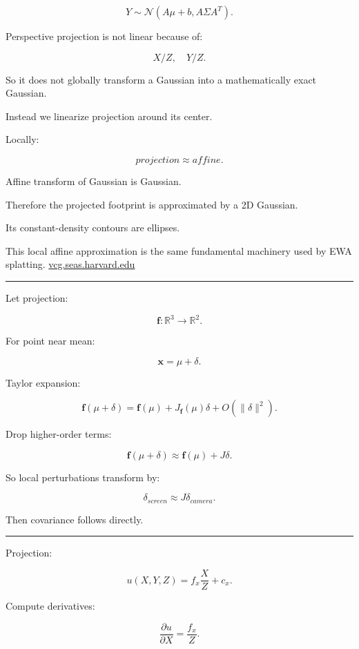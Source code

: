 \[
Y
\sim
\mathcal N(
A\mu+b,
A\Sigma A^T
).
\]

Perspective projection is not linear because of:

\[
X/Z,\quad Y/Z.
\]

So it does not globally transform a Gaussian into a mathematically exact Gaussian.

Instead we linearize projection around its center.

Locally:

\[
projection
\approx
affine.
\]

Affine transform of Gaussian is Gaussian.

Therefore the projected footprint is approximated by a 2D Gaussian.

Its constant-density contours are ellipses.

This local affine approximation is the same fundamental machinery used by EWA splatting. \href{https://vcg.seas.harvard.edu/content/3-publications/20010101-surface-splatting/p371-zwicker.pdf?utm_source=chatgpt.com}{vcg.seas.harvard.edu}

\begin{center}\rule{0.5\linewidth}{0.5pt}\end{center}

Let projection:

\[
\mathbf f:
\mathbb R^3
\rightarrow
\mathbb R^2.
\]

For point near mean:

\[
\mathbf x=
\mu+\delta.
\]

Taylor expansion:

\[
\mathbf f(\mu+\delta)
=
\mathbf f(\mu)
+
J_{\mathbf f}(\mu)\delta
+
O(\|\delta\|^2).
\]

Drop higher-order terms:

\[
\boxed{
\mathbf f(\mu+\delta)
\approx
\mathbf f(\mu)
+
J\delta.
}
\]

So local perturbations transform by:

\[
\delta_{screen}
\approx
J\delta_{camera}.
\]

Then covariance follows directly.

\begin{center}\rule{0.5\linewidth}{0.5pt}\end{center}

Projection:

\[
u(X,Y,Z)
=
f_x\frac XZ+c_x.
\]

Compute derivatives:

\[
\frac{\partial u}{\partial X}
=
\frac{f_x}{Z}.
\]

